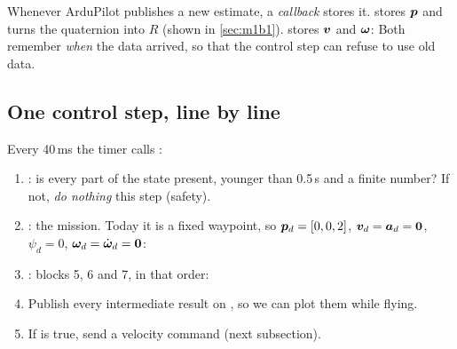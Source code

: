 Whenever ArduPilot publishes a new estimate, a \emph{callback} stores it.  stores $\bm{p}$ and turns the
quaternion into $R$ (shown in \cref{sec:m1b1}).  stores $\bm{v}$ and $\bm{\omega}$:
Both remember \emph{when} the data arrived, so that the control step can refuse to use old data.

\subsection{One control step, line by line}

Every 40\,ms the timer calls :
\begin{enumerate}
  \item {}: is every part of the state present, younger than 0.5\,s and a finite number? If not,
        \emph{do nothing} this step (safety).
  \item {}: the mission. Today it is a fixed waypoint, so $\bm{p}_d=[0,0,2]$, $\bm{v}_d=\bm{a}_d=\bm0$,
        $\psi_d=0$, $\bm{\omega}_d=\dot{\bm{\omega}}_d=\bm0$:
  \item {}: blocks 5, 6 and 7, in that order:
  \item Publish every intermediate result on , so we can plot them while flying.
  \item If  is true, send a velocity command (next subsection).
\end{enumerate}

